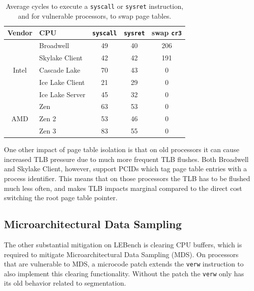 \begin{table}[h]
  \begin{center}
  \begin{tabular}{clccc} 
    \textbf{Vendor} & \textbf{CPU} & \textbf{\texttt{syscall}} & \textbf{\texttt{sysret}}  & \textbf{swap \texttt{cr3}} \\ \hline 
    \multirow{5}{*}{Intel} & Broadwell             & 49 & 40 & 206 \\
                           & Skylake Client        & 42 & 42 & 191 \\
                           & Cascade Lake          & 70 & 43 & 0 \\
                           & Ice Lake Client       & 21 & 29 & 0 \\
                           & Ice Lake Server       & 45 & 32 & 0 \\ \hline
      \multirow{3}{*}{AMD} & Zen                   & 63 & 53 & 0 \\
                           & Zen 2                 & 53 & 46 & 0 \\
                           & Zen 3                 & 83 & 55 & 0 \\ \hline
  \end{tabular}
  \end{center}
  \caption{Average cycles to execute a \texttt{syscall} or \texttt{sysret} instruction, and for vulnerable processors, to swap page tables. }
  \label{table:meltdown}
\end{table}

One other impact of page table isolation is that on old processors it can cause increased TLB pressure due to much more frequent TLB flushes.
Both Broadwell and Skylake Client, however, support PCIDs which tag page table entries with a process identifier.
This means that on those processors the TLB has to be flushed much less often, and makes TLB impacts marginal compared to the direct cost switching the root page table pointer.

\subsection{Microarchitectural Data Sampling}

The other substantial mitigation on LEBench is clearing CPU buffers, which is required to mitigate Microarchitectural Data Sampling (MDS).
On processors that are vulnerable to MDS, a microcode patch extends the \texttt{verw} instruction to also implement this clearing functionality.
Without the patch the \texttt{verw} only has its old behavior related to segmentation.

